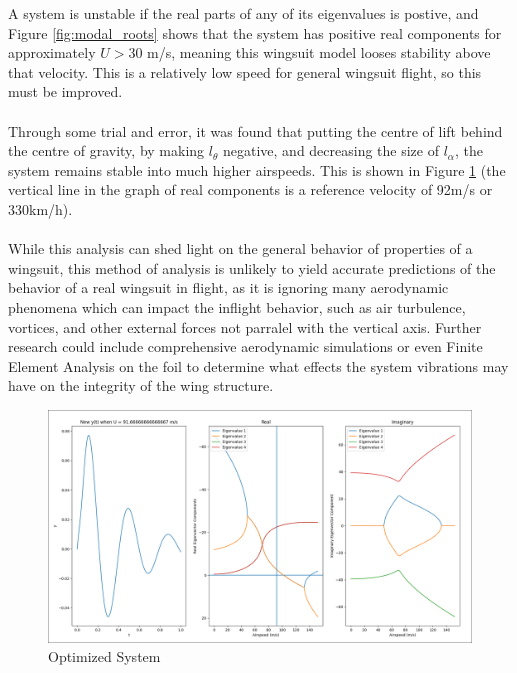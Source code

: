 \documentclass[11pt]{article}
\begin{document}
A system is unstable if the real parts of any of its eigenvalues is postive, and Figure \ref{fig:modal_roots} shows that the system has positive real components for approximately $U > 30$ m/s, meaning this wingsuit model looses stability above that velocity. This is a relatively low speed for general wingsuit flight, so this must be improved.
\\\\
Through some trial and error, it was found that putting the centre of lift behind the centre of gravity, by making $l_{\theta}$ negative, and decreasing the size of $l_{\alpha}$, the system remains stable into much higher airspeeds. This is shown in Figure \ref{fig:optimized_system} (the vertical line in the graph of real components is a reference velocity of 92m/s or 330km/h).
\\\\
While this analysis can shed light on the general behavior of properties of a wingsuit, this method of analysis is unlikely to yield accurate predictions of the behavior of a real wingsuit in flight, as it is ignoring many aerodynamic phenomena which can impact the inflight behavior, such as air turbulence, vortices, and other external forces not parralel with the vertical axis. Further research could include comprehensive aerodynamic simulations or even Finite Element Analysis on the foil to determine what effects the system vibrations may have on the integrity of the wing structure.
\begin{figure}[h!]
  \centering
  \includegraphics[width=170mm, trim=3 3 3 3, clip]{optimized_system.png}
  \caption{Optimized System}\label{fig:optimized_system}
\end{figure}

\end{document}
